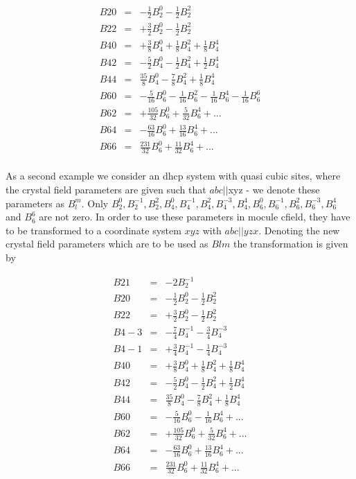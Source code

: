 \begin{eqnarray}
 B20&=&-\frac{1}{2} B_2^0 -\frac{1}{2} B_2^2  \nonumber \\  
 B22&=&+\frac{3}{2} B_2^0 -\frac{1}{2} B_2^2  \nonumber \\
 B40&=&+\frac{3}{8} B_4^0 +\frac{1}{8} B_4^2 +\frac{1}{8} B_4^4     \nonumber \\
 B42&=&-\frac{5}{2} B_4^0 -\frac{1}{2} B_4^2 +\frac{1}{2} B_4^4    \nonumber \\
 B44&=&\frac{35}{8} B_4^0 -\frac{7}{8} B_4^2 +\frac{1}{8} B_4^4  \nonumber \\
 B60&=&-\frac{5}{16} B_6^0-\frac{1}{16} B_6^2-\frac{1}{16} B_6^4-\frac{1}{16} B_6^6  %
\nonumber \\
 B62&=&+\frac{105}{32} B_6^0+\frac{5}{32} B_6^4+...  \nonumber \\
 B64&=&-\frac{63}{16} B_6^0+\frac{13}{16} B_6^4+...  \nonumber \\
 B66&=&\frac{231}{32} B_6^0+\frac{11}{32} B_6^4+...  \nonumber \\
\end{eqnarray}

As a second example we consider an dhcp system with quasi cubic sites, where the crystal %
field parameters
are given such that  $abc||$xyz - we denote these parameters as
 $B_l^m$. Only $B_2^0,B_2^{-1},B_2^2, B_4^0,B_4^{-1},B_4^2,B_4^{-3}, B_4^4, %
B_6^0,B_6^{-1}, B_6^2,B_6^{-3}, B_6^4$ and $B_6^6$ are
 not zero. In order to use these parameters in {\prg mocule cfield}, they 
 have to be transformed to a coordinate system $xyz$ with $abc||yzx$. Denoting the new
 crystal field parameters which are to be used as $Blm$ the transformation
 is given by 
 
\begin{eqnarray}
 B21&=&-2B_2^{-1}  \nonumber \\  
 B20&=&-\frac{1}{2} B_2^0 -\frac{1}{2} B_2^2  \nonumber \\  
 B22&=&+\frac{3}{2} B_2^0 -\frac{1}{2} B_2^2  \nonumber \\
 B4-3&=&-\frac{7}{4} B_4^{-1} -\frac{3}{4} B_4^{-3}  \nonumber \\
 B4-1&=&+\frac{3}{4} B_4^{-1} -\frac{1}{4} B_4^{-3}  \nonumber \\
 B40&=&+\frac{3}{8} B_4^0 +\frac{1}{8} B_4^2 +\frac{1}{8} B_4^4     \nonumber \\
 B42&=&-\frac{5}{2} B_4^0 -\frac{1}{2} B_4^2 +\frac{1}{2} B_4^4    \nonumber \\
 B44&=&\frac{35}{8} B_4^0 -\frac{7}{8} B_4^2 +\frac{1}{8} B_4^4  \nonumber \\
 B60&=&-\frac{5}{16} B_6^0-\frac{1}{16} B_6^4+...  \nonumber \\
 B62&=&+\frac{105}{32} B_6^0+\frac{5}{32} B_6^4+...  \nonumber \\
 B64&=&-\frac{63}{16} B_6^0+\frac{13}{16} B_6^4+...  \nonumber \\
 B66&=&\frac{231}{32} B_6^0+\frac{11}{32} B_6^4+...  \nonumber \\
\end{eqnarray}

